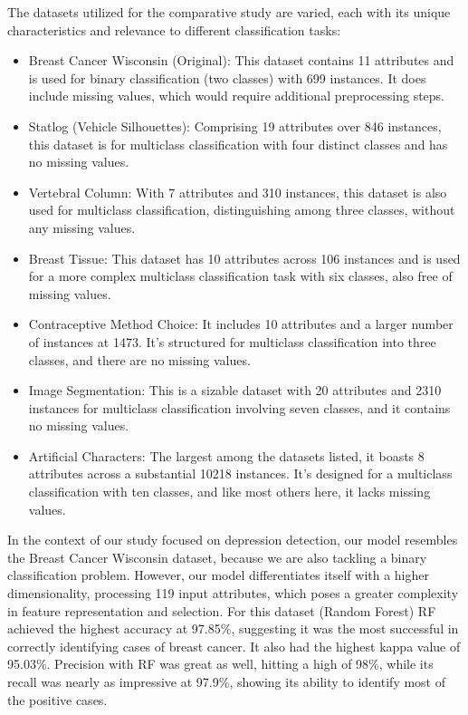 The datasets utilized for the comparative study are varied, each with its unique characteristics and relevance to different classification tasks:
\begin{itemize}
 
\item Breast Cancer Wisconsin (Original): This dataset contains 11 attributes and is used for binary classification (two classes) with 699 instances. It does include missing values, which would require additional preprocessing steps.

\item Statlog (Vehicle Silhouettes): Comprising 19 attributes over 846 instances, this dataset is for multiclass classification with four distinct classes and has no missing values.

\item Vertebral Column: With 7 attributes and 310 instances, this dataset is also used for multiclass classification, distinguishing among three classes, without any missing values.

\item Breast Tissue: This dataset has 10 attributes across 106 instances and is used for a more complex multiclass classification task with six classes, also free of missing values.

\item Contraceptive Method Choice: It includes 10 attributes and a larger number of instances at 1473. It’s structured for multiclass classification into three classes, and there are no missing values.

\item Image Segmentation: This is a sizable dataset with 20 attributes and 2310 instances for multiclass classification involving seven classes, and it contains no missing values.

\item Artificial Characters: The largest among the datasets listed, it boasts 8 attributes across a substantial 10218 instances. It’s designed for a multiclass classification with ten classes, and like most others here, it lacks missing values.

\end{itemize}

In the context of our study focused on depression detection, our model resembles the Breast Cancer Wisconsin dataset, because we are also tackling a binary classification problem. However, our model differentiates itself with a higher dimensionality, processing 119 input attributes, which poses a greater complexity in feature representation and selection. For this dataset (Random Forest) RF achieved the highest accuracy at 97.85\%, suggesting it was the most successful in correctly identifying cases of breast cancer. It also had the highest kappa value of 95.03\%. Precision with RF was great as well, hitting a high of 98\%, while its recall was nearly as impressive at 97.9\%, showing its ability to identify most of the positive cases. 

